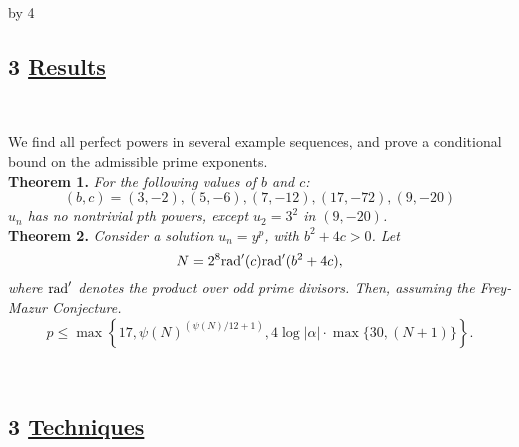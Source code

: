 \documentclass[12pt]{scrartcl}
\newcommand{\rad}{{\rm{rad}}}
\def\anzspalten{4}
\newlength{\kastenwidth}
\newenvironment{kasten}{%
  \begin{lrbox}{\dummybox}%
    \begin{minipage}{0.96\linewidth}}%
    {\end{minipage}%
  \end{lrbox}%
  \raisebox{-\depth}{\psshadowbox[framesep=1em]{\usebox{\dummybox}}}\\[0.5em]}
\newenvironment{spalte}{%
  \setlength\kastenwidth{1.2\textwidth}
  \divide\kastenwidth by \anzspalten
  \begin{minipage}[t]{\kastenwidth}}{\end{minipage}\hfill}
\begin{document}
\begin{lrbox}{\spalten}
{\begin{spalte}







\begin{kasten}
\section*{3 \hspace{0.1cm} {\color{red} 
\underline{Results}}}
\end{kasten}

\begin{kasten}

We find all perfect powers in several example sequences, and prove a conditional bound on the admissible prime exponents. \\

\textbf{\large \color{blue} Theorem 1.} \textit{For the following values of $b$ and $c$:
\[ (b,c) = (3,-2), (5,-6), (7,-12), (17,-72), (9,-20) \]
$u_n$ has no nontrivial $p$th powers, except $u_2 = 3^2$ in $(9,-20)$.} \\

\textbf{\large\color{blue} Theorem 2.} \textit{Consider a solution $u_n = y^p$, with $b^2+4c >0$. Let \[ N = 2^8  {\rad}'(c)\rad'(b^2+4c),\]
where $\rad'$ denotes the product over odd prime divisors.  Then, assuming the Frey-Mazur Conjecture. 
\[ p \leq \max\left\{17,   \psi(N)^{(\psi(N)/12+1)}, 4\log{|\alpha|} \cdot  \max\{30,( N+1)\}  \right\}. \]}

\end{kasten}
\begin{kasten}
\section*{3 \hspace{0.1cm} {\color{red} 
\underline{Techniques}}}
\end{kasten}




\end{spalte}}
\end{lrbox}
\end{document}
